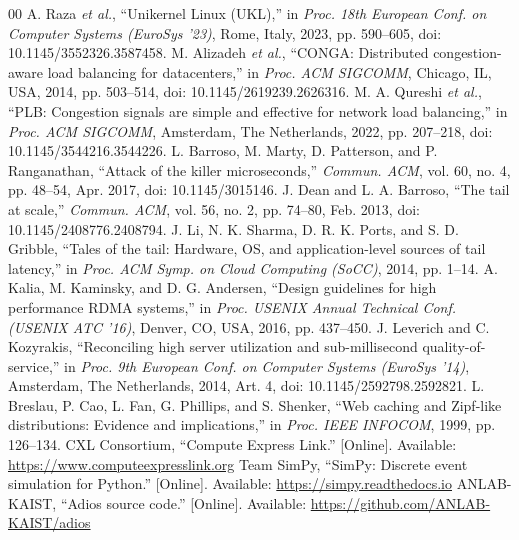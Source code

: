 \documentclass[conference]{IEEEtran}
\begin{document}
\begin{thebibliography}{00}
 A. Raza \textit{et al.}, ``Unikernel Linux (UKL),'' in \textit{Proc. 18th European Conf. on Computer Systems (EuroSys '23)}, Rome, Italy, 2023, pp. 590--605, doi: 10.1145/3552326.3587458.
 M. Alizadeh \textit{et al.}, ``CONGA: Distributed congestion-aware load balancing for datacenters,'' in \textit{Proc. ACM SIGCOMM}, Chicago, IL, USA, 2014, pp. 503--514, doi: 10.1145/2619239.2626316.
 M. A. Qureshi \textit{et al.}, ``PLB: Congestion signals are simple and effective for network load balancing,'' in \textit{Proc. ACM SIGCOMM}, Amsterdam, The Netherlands, 2022, pp. 207--218, doi: 10.1145/3544216.3544226.
 L. Barroso, M. Marty, D. Patterson, and P. Ranganathan, ``Attack of the killer microseconds,'' \textit{Commun. ACM}, vol. 60, no. 4, pp. 48--54, Apr. 2017, doi: 10.1145/3015146.
 J. Dean and L. A. Barroso, ``The tail at scale,'' \textit{Commun. ACM}, vol. 56, no. 2, pp. 74--80, Feb. 2013, doi: 10.1145/2408776.2408794.
 J. Li, N. K. Sharma, D. R. K. Ports, and S. D. Gribble, ``Tales of the tail: Hardware, OS, and application-level sources of tail latency,'' in \textit{Proc. ACM Symp. on Cloud Computing (SoCC)}, 2014, pp. 1--14.
 A. Kalia, M. Kaminsky, and D. G. Andersen, ``Design guidelines for high performance RDMA systems,'' in \textit{Proc. USENIX Annual Technical Conf. (USENIX ATC '16)}, Denver, CO, USA, 2016, pp. 437--450.
 J. Leverich and C. Kozyrakis, ``Reconciling high server utilization and sub-millisecond quality-of-service,'' in \textit{Proc. 9th European Conf. on Computer Systems (EuroSys '14)}, Amsterdam, The Netherlands, 2014, Art. 4, doi: 10.1145/2592798.2592821.
 L. Breslau, P. Cao, L. Fan, G. Phillips, and S. Shenker, ``Web caching and Zipf-like distributions: Evidence and implications,'' in \textit{Proc. IEEE INFOCOM}, 1999, pp. 126--134.
 CXL Consortium, ``Compute Express Link.'' [Online]. Available: \url{https://www.computeexpresslink.org}
 Team SimPy, ``SimPy: Discrete event simulation for Python.'' [Online]. Available: \url{https://simpy.readthedocs.io}
 ANLAB-KAIST, ``Adios source code.'' [Online]. Available: \url{https://github.com/ANLAB-KAIST/adios}
\end{thebibliography}
\end{document}
